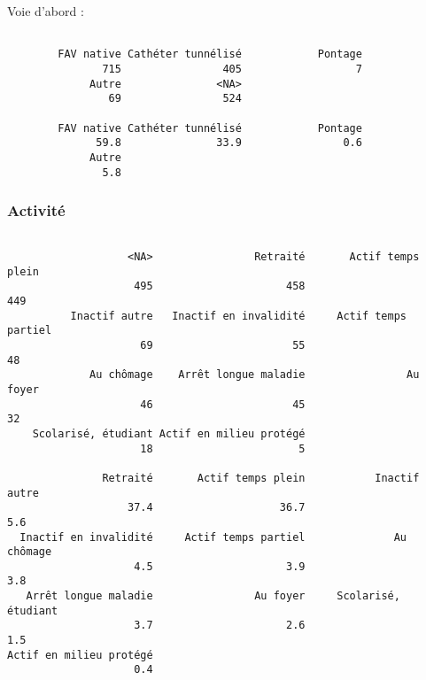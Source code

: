 \documentclass[11pt,a4paper]{article}\usepackage[]{graphicx}\usepackage[]{color}
\makeatletter
\newenvironment{kframe}{%
 \def\at@end@of@kframe{}%
 \ifinner\ifhmode%
  \def\at@end@of@kframe{\end{minipage}}%
  \begin{minipage}{\columnwidth}%
 \fi\fi%
 \def\FrameCommand##1{\hskip\@totalleftmargin \hskip-\fboxsep
 \colorbox{shadecolor}{##1}\hskip-\fboxsep
     \hskip-\linewidth \hskip-\@totalleftmargin \hskip\columnwidth}%
 \MakeFramed {\advance\hsize-\width
   \@totalleftmargin\z@ \linewidth\hsize
   \@setminipage}}%
 {\par\unskip\endMakeFramed%
 \at@end@of@kframe}
\newenvironment{knitrout}{}{} %
\makeatother
\begin{document}
Voie d’abord :
\begin{knitrout}
\color{fgcolor}\begin{kframe}
\begin{verbatim}

        FAV native Cathéter tunnélisé            Pontage 
               715                405                  7 
             Autre               <NA> 
                69                524 

        FAV native Cathéter tunnélisé            Pontage 
              59.8               33.9                0.6 
             Autre 
               5.8 
\end{verbatim}
\end{kframe}
\end{knitrout}

    \subsubsection{Activité}

\begin{knitrout}
\color{fgcolor}\begin{kframe}
\begin{verbatim}

                   <NA>                Retraité       Actif temps plein 
                    495                     458                     449 
          Inactif autre   Inactif en invalidité     Actif temps partiel 
                     69                      55                      48 
             Au chômage    Arrêt longue maladie                Au foyer 
                     46                      45                      32 
    Scolarisé, étudiant Actif en milieu protégé 
                     18                       5 

               Retraité       Actif temps plein           Inactif autre 
                   37.4                    36.7                     5.6 
  Inactif en invalidité     Actif temps partiel              Au chômage 
                    4.5                     3.9                     3.8 
   Arrêt longue maladie                Au foyer     Scolarisé, étudiant 
                    3.7                     2.6                     1.5 
Actif en milieu protégé 
                    0.4 
\end{verbatim}
\end{kframe}
\end{knitrout}
\end{document}
